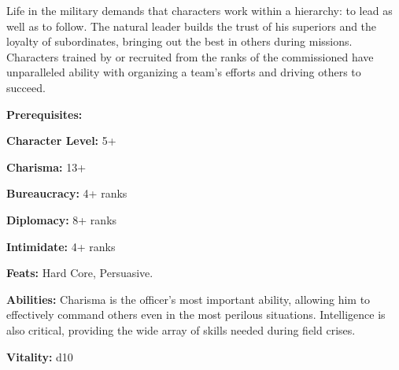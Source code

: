 \begin{multicols}{2}

Life in the military demands that characters work within a hierarchy: to lead as well as to follow. The natural leader builds the trust of his superiors and the loyalty of subordinates, bringing out the best in others during missions. Characters trained by or recruited from the ranks of the commissioned have unparalleled ability with organizing a team's efforts and driving others to succeed.

\columnbreak

\textbf{Prerequisites:} 
\begin{description*}
\item[\hspace{1.5cm}\textbf{Character Level:}] 5+
\item[\hspace{1.5cm}\textbf{Charisma:}] 13+
\item[\hspace{1.5cm}\textbf{Bureaucracy:}] 4+ ranks
\item[\hspace{1.5cm}\textbf{Diplomacy:}] 8+ ranks
\item[\hspace{1.5cm}\textbf{Intimidate:}] 4+ ranks
\item[\hspace{1.5cm}\textbf{Feats:}] Hard Core, Persuasive.
\end{description*}

\textbf{Abilities:} Charisma is the officer's most important ability, allowing him to effectively command others even in the most perilous situations. Intelligence is also critical, providing the wide array of skills needed during field crises.

\textbf{Vitality:} d10

\end{multicols}

\setlength{\intextsep}{-3cm}

